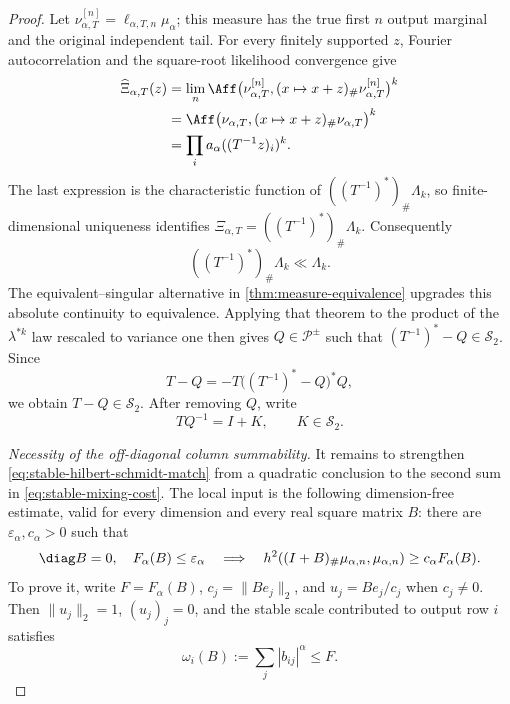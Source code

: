 \begin{proof}
Let \(\nu_{\alpha,T}^{[n]}=\ell_{\alpha,T,n}\mu_\alpha\); this measure has the true first \(n\)
output marginal and the original independent tail.
For every finitely supported \(z\), Fourier autocorrelation and
the square-root likelihood convergence give
\begin{align*}
 \widehat\Xi_{\alpha,T}(z)
 &=\lim_n\Aff\bigl(\nu_{\alpha,T}^{[n]},
             (x\mapsto x+z)_\#\nu_{\alpha,T}^{[n]}\bigr)^k\\
 &=\Aff\bigl(\nu_{\alpha,T},
        (x\mapsto x+z)_\#\nu_{\alpha,T}\bigr)^k\\
 &=\prod_i a_\alpha((T^{-1}z)_i)^k.
\end{align*}
The last expression is the characteristic function of
\(((T^{-1})^*)_\#\Lambda_k\), so finite-dimensional uniqueness identifies
\(\Xi_{\alpha,T}=((T^{-1})^*)_\#\Lambda_k\).
Consequently
\begin{equation}
 ((T^{-1})^*)_\#\Lambda_k\ll\Lambda_k.
 \label{eq:stable-fourier-transfer}
\end{equation}
The equivalent--singular alternative in \cref{thm:measure-equivalence}
upgrades this absolute continuity to equivalence.  Applying that theorem to
the product of the \(\lambda^{*k}\) law rescaled to variance one then gives
\(Q\in\mathcal P^{\pm}\) such that
\((T^{-1})^*-Q\in\mathcal S_2\).
Since
\[
 T-Q=-T\bigl((T^{-1})^*-Q\bigr)^*Q,
\]
we obtain \(T-Q\in\mathcal S_2\).
After removing \(Q\), write
\begin{equation}
 TQ^{-1}=I+K,
 \qquad K\in\mathcal S_2.
 \label{eq:stable-hilbert-schmidt-match}
\end{equation}

\emph{Necessity of the off-diagonal column summability.}
It remains to strengthen \eqref{eq:stable-hilbert-schmidt-match} from a
quadratic conclusion to the second sum in
\eqref{eq:stable-mixing-cost}.
The local input is the following dimension-free estimate,
valid for every dimension and every real square matrix \(B\): there are
\(\varepsilon_\alpha,c_\alpha>0\) such that
\begin{equation}
 \diag B=0,\quad F_\alpha(B)\le\varepsilon_\alpha
 \quad\Longrightarrow\quad
 h^2((I+B)_\#\mu_{\alpha,n},\mu_{\alpha,n})
 \ge c_\alpha F_\alpha(B).
 \label{eq:stable-off-diagonal-column-lower-bound}
\end{equation}
To prove it, write \(F=F_\alpha(B)\),
\(c_j=\|Be_j\|_2\), and
\(u_j=Be_j/c_j\) when \(c_j\ne0\).
Then \(\|u_j\|_2=1\), \((u_j)_j=0\), and the stable scale contributed to
output row \(i\) satisfies
\begin{equation}
 \omega_i(B):=\sum_j|b_{ij}|^\alpha\le F.
 \label{eq:stable-row-scale-bound}
\end{equation}


\end{proof}
